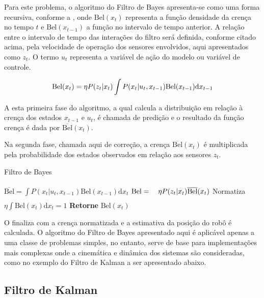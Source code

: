 Para este problema, o algoritmo do Filtro de Bayes apresenta-se como uma forma recursiva, conforme a , onde $\text{Bel}(x_t)$ representa a função densidade da crença no tempo $t$ e $\text{Bel}(x_{t-1})$ a função no intervalo de tempo anterior. A relação entre o intervalo de tempo das interações do filtro será definida, conforme citado acima, pela velocidade de operação dos sensores envolvidos, aqui apresentados como $z_t$. O termo $u_t$ representa a variável de ação do modelo ou variável de controle.

\begin{equation}
    \label{eq:bayes2}
    \text{\text{Bel}}(x_t) = \eta P(z_t| x_t) \int P(x_t| u_t, x_{t-1}) \text{Bel}(x_{t-1})\text{d}x_{t-1}
\end{equation}

A esta primeira fase do algoritmo, a qual calcula a distribuição em relação à crença dos estados $x_{t-1}$ e $u_t$, é chamada de predição e o resultado da função crença é dada por $\overline{\text{Bel}}(x_t)$.

Na segunda fase, chamada aqui de correção, a crença $\overline{\text{Bel}}(x_t)$ é multiplicada pela probabilidade dos estados observados em relação aos sensores $z_t$.

\begin{algorithm}[H]
    \caption{Filtro de Bayes}
    \begin{algorithmic}[1]
        \State $\overline{\text{Bel}}= \displaystyle\int P(x_t| u_t, x_{t-1})\text{Bel}(x_{t-1})\text{d}x_t$
    \EndProcedure
        \State ${\text{Bel}}= \displaystyle\textcolor{white}{\int}  \eta P(z_t| x_{t})\overline{\text{Bel}}(x_{t})$
    \EndProcedure
    \State Normatiza $\eta \displaystyle\int \text{Bel}(x_t)\text{d}x_t = 1$
    \State \textbf{Retorne} $\text{Bel}(x_t)$
    \end{algorithmic}
    \label{algo:bayes}
\end{algorithm}

O  finaliza com a crença normatizada e a estimativa da posição do robô é calculada. O algoritmo do Filtro de Bayes apresentado aqui é aplicável apenas a uma classe de problemas simples, no entanto, serve de base para implementações mais complexas onde a cinemática e dinâmica dos sistemas são consideradas, como no exemplo do Filtro de Kalman a ser apresentado abaixo.

\subsection{Filtro de Kalman}

